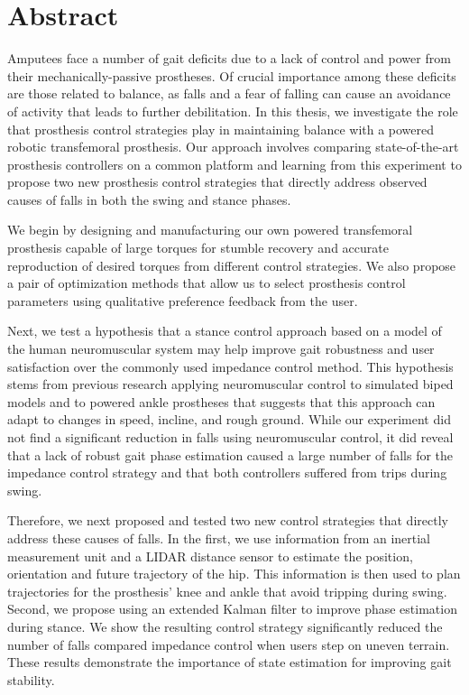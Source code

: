 \chapter*{Abstract}

Amputees face a number of gait deficits due to a lack of control and power from
their mechanically-passive prostheses. Of crucial importance among these
deficits are those related to balance, as falls and a fear of falling can cause
an avoidance of activity that leads to further debilitation. In this thesis, we
investigate the role that prosthesis control strategies play in maintaining
balance with a powered robotic transfemoral prosthesis. Our approach involves
comparing state-of-the-art prosthesis controllers on a common platform and
learning from this experiment to propose two new prosthesis control strategies
that directly address observed causes of falls in both the swing and stance
phases.

We begin by designing and manufacturing our own powered transfemoral prosthesis
capable of large torques for stumble recovery and accurate reproduction of
desired torques from different control strategies. We also propose a pair of
optimization methods that allow us to select prosthesis control parameters using
qualitative preference feedback from the user.

Next, we test a hypothesis that a stance control approach based on a model of
the human neuromuscular system may help improve gait robustness and user
satisfaction over the commonly used impedance control method. This hypothesis
stems from previous research applying neuromuscular control to simulated biped
models and to powered ankle prostheses that suggests that this approach can
adapt to changes in speed, incline, and rough ground. While our experiment did
not find a significant reduction in falls using neuromuscular control, it did
reveal that a lack of robust gait phase estimation caused a large number of
falls for the impedance control strategy and that both controllers suffered from
trips during swing.

Therefore, we next proposed and tested two new control strategies that directly
address these causes of falls. In the first, we use information from an inertial
measurement unit and a LIDAR distance sensor to estimate the position,
orientation and future trajectory of the hip. This information is then used to
plan trajectories for the prosthesis' knee and ankle that avoid tripping during
swing. Second, we propose using an extended Kalman filter to improve phase
estimation during stance. We show the resulting control strategy significantly
reduced the number of falls compared impedance control when users step on uneven
terrain. These results demonstrate the importance of state estimation for
improving gait stability.
